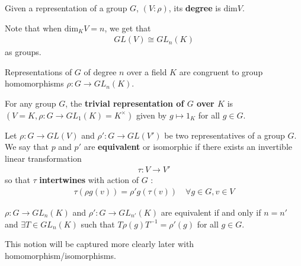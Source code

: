 \documentclass{memoir}
\begin{document}

\begin{defn}
	Given a representation of a group \(G\), \((V:\rho)\), its \textbf{degree} is \(\textrm{dim}V\).
\end{defn}
Note that when \(\textrm{dim}_KV=n\), we get that
\begin{align*}
	GL(V) \cong GL_n(K)
\end{align*}
as groups.


Representations of \(G\) of degree \(n\) over a field \(K\) are congruent to group homomorphisms \(\rho:G\to GL_n(K)\).

\begin{defn}
	For any group \(G\), the \textbf{trivial representation of \(G\) over \(K\)} is \((V=K, \rho:G\to GL_1(K)=K^{\times })\) given by \(g\mapsto 1_K\) for all \(g \in G\).
\end{defn}


\begin{defn}
	Let \(\rho:G\to GL(V)\) and \(\rho':G\to GL(V')\) be two representatives of a group \(G\). We say that \(p\) and \(p'\) are \textbf{equivalent} or isomorphic if there exists an invertible linear transformation
	\begin{align*}
		\tau:V\to V'
	\end{align*}
	so that \(\tau\) \textbf{intertwines} with action of \(G\) :
	\begin{align*}
		\tau(\rho g(v)) = \rho'g(\tau(v)) \quad \forall g \in G, v \in V
	\end{align*}
\end{defn}

\begin{rmrk}
	\(\rho:G\to GL_n(K)\) and \(\rho':G\to GL_{n'}(K)\) are equivalent if and only if \(n = n'\) and \(\exists T \in GL_n(K)\) such that \(T\rho(g)T^{-1} = \rho'(g)\) for all \(g \in G\).
\end{rmrk}
This notion will be captured more clearly later with homomorphism/isomorphisms.
\end{document}
